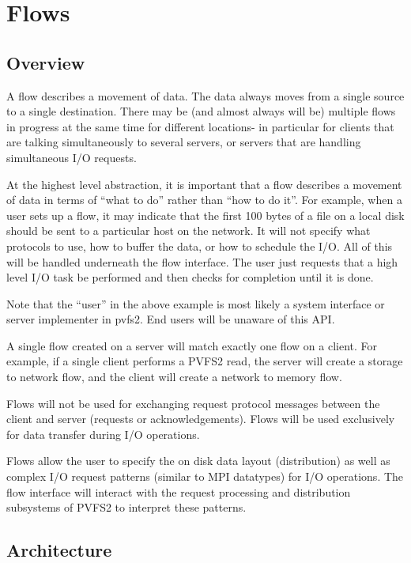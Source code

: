 \documentclass[12pt]{article} %
\begin{document}
\section{Flows}

\subsection{Overview}

A flow describes a movement of data.  The data always moves from a single
source to a single destination.  There may be (and almost always will be)
multiple flows in progress at the same time for different locations-
in particular for clients that are talking simultaneously to several
servers, or servers that are handling simultaneous I/O requests.

At the highest level abstraction, it is important that a flow describes
a movement of data in terms of ``what to do'' rather than ``how to do
it''.  For example, when a user sets up a flow, it may indicate that the
first 100 bytes of a file on a local disk should be sent to
a particular host on the network.  It will not specify what protocols to
use, how to buffer the data, or how to schedule the I/O.  All of this will be
handled underneath the flow interface.  The user just requests that a
high level I/O task be performed and then checks for completion until it
is done.

Note that the ``user'' in the above example is most likely a
system interface or server implementer in pvfs2.  End users will
be unaware of this API.

A single flow created on a server will match exactly one flow on a
client.  For example, if a single client performs a PVFS2 read, the
server will create a storage to network flow, and the client will
create a network to memory flow.

Flows will not be used for exchanging request protocol messages
between the client and server (requests or acknowledgements).
Flows will be used exclusively for data transfer during I/O
operations.

Flows allow the user to specify the on disk data layout
(distribution) as well as complex I/O request patterns (similar to
MPI datatypes) for I/O operations.  The flow interface will
interact with the request processing and distribution subsystems
of PVFS2 to interpret these patterns.

\subsection{Architecture}
\label{sec:arch}
\end{document}
